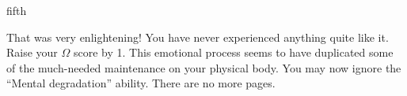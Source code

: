 \documentclass[notebook]{guildcamp1}
\begin{document}
\begin{page}{fifth}

That was very enlightening! You have never experienced anything quite like it. Raise your $\Omega$ score by 1. This emotional process seems to have duplicated some of the much-needed maintenance on your physical body. You may now ignore the ``Mental degradation'' ability. There are no more pages.

\end{page}

\endnotebook
\end{document}
